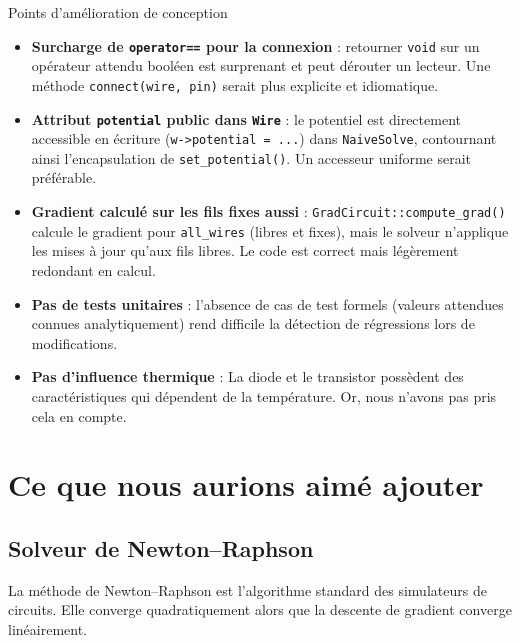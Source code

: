 \documentclass[12pt,a4paper]{article}
\begin{document}
\begin{warningbox}{Points d'amélioration de conception}
\begin{itemize}
  \item \textbf{Surcharge de \texttt{operator==} pour la connexion} : retourner
        \texttt{void} sur un opérateur attendu booléen est surprenant et peut
        dérouter un lecteur. Une méthode \texttt{connect(wire, pin)} serait plus
        explicite et idiomatique.
  \item \textbf{Attribut \texttt{potential} public dans \texttt{Wire}} : le
        potentiel est directement accessible en écriture (\texttt{w->potential = ...})
        dans \texttt{NaiveSolve}, contournant ainsi l'encapsulation de
        \texttt{set\_potential()}. Un accesseur uniforme serait préférable.
  \item \textbf{Gradient calculé sur les fils fixes aussi} : \texttt{GradCircuit::compute\_grad()}
        calcule le gradient pour \texttt{all\_wires} (libres et fixes), mais
        le solveur n'applique les mises à jour qu'aux fils libres. Le code est
        correct mais légèrement redondant en calcul.
  \item \textbf{Pas de tests unitaires} : l'absence de cas de test formels (valeurs
        attendues connues analytiquement) rend difficile la détection de
        régressions lors de modifications.
  \item \textbf{Pas d'influence thermique} : La diode et le transistor possèdent des caractéristiques
        qui dépendent de la température. Or, nous n'avons pas pris cela en compte.
\end{itemize}
\end{warningbox}

\section{Ce que nous aurions aimé ajouter}

\subsection{Solveur de Newton--Raphson}

La méthode de Newton--Raphson est l'algorithme standard des simulateurs de
circuits. Elle converge quadratiquement alors que la
descente de gradient converge linéairement.
\end{document}
